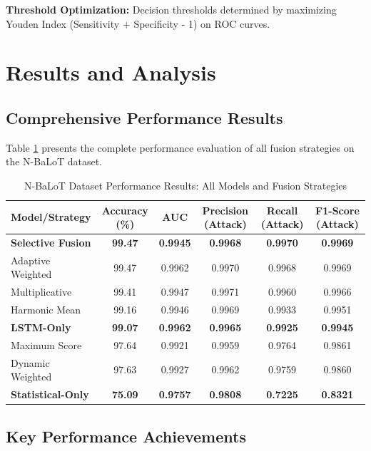 \documentclass[conference]{IEEEtran}
\begin{document}
\textbf{Threshold Optimization:} Decision thresholds determined by maximizing Youden Index (Sensitivity + Specificity - 1) on ROC curves.

\section{Results and Analysis}

\subsection{Comprehensive Performance Results}

Table \ref{tab:nbalot_results} presents the complete performance evaluation of all fusion strategies on the N-BaLoT dataset.

\begin{table}[!t]
\centering
\caption{N-BaLoT Dataset Performance Results: All Models and Fusion Strategies}
\label{tab:nbalot_results}
\begin{tabular}{@{}lccccc@{}}
\toprule
\textbf{Model/Strategy} & \textbf{Accuracy (\%)} & \textbf{AUC} & \textbf{Precision (Attack)} & \textbf{Recall (Attack)} & \textbf{F1-Score (Attack)} \\
\midrule
\textbf{Selective Fusion} & \textbf{99.47} & \textbf{0.9945} & \textbf{0.9968} & \textbf{0.9970} & \textbf{0.9969} \\
Adaptive Weighted & 99.47 & 0.9962 & 0.9970 & 0.9968 & 0.9969 \\
Multiplicative & 99.41 & 0.9947 & 0.9971 & 0.9960 & 0.9966 \\
Harmonic Mean & 99.16 & 0.9946 & 0.9969 & 0.9933 & 0.9951 \\
\textbf{LSTM-Only} & \textbf{99.07} & \textbf{0.9962} & \textbf{0.9965} & \textbf{0.9925} & \textbf{0.9945} \\
Maximum Score & 97.64 & 0.9921 & 0.9959 & 0.9764 & 0.9861 \\
Dynamic Weighted & 97.63 & 0.9927 & 0.9962 & 0.9759 & 0.9860 \\
\textbf{Statistical-Only} & \textbf{75.09} & \textbf{0.9757} & \textbf{0.9808} & \textbf{0.7225} & \textbf{0.8321} \\
\bottomrule
\end{tabular}
\end{table}

\subsection{Key Performance Achievements}
\end{document}
